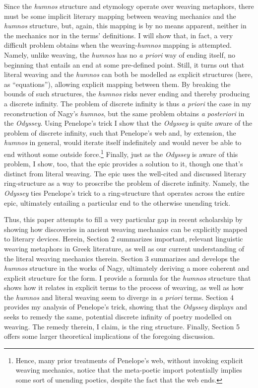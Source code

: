 \documentclass[12pt]{article}
\begin{document}
Since the \textit{humnos} structure and etymology operate over weaving metaphors, there must be some implicit literary mapping between weaving mechanics and the \textit{humnos} structure, but, again, this mapping is by no means apparent, neither in the mechanics nor in the terms' definitions. I will show that, in fact, a very difficult problem obtains when the weaving-\textit{humnos} mapping is attempted. Namely, unlike weaving, the \textit{humnos} has no \textit{a priori} way of ending itself, no beginning that entails an end at some pre-defined point. Still, it turns out that literal weaving and the \textit{humnos} can both be modelled as explicit structures (here, as ``equations''), allowing explicit mapping between them. By breaking the bounds of such structures, the \textit{humnos} risks never ending and thereby producing a discrete infinity. The problem of discrete infinity is thus \textit{a priori} the case in my reconstruction of Nagy's \textit{humnos}, but the same problem obtains \textit{a posteriori} in the \textit{Odyssey}. Using Penelope's trick I show that the \textit{Odyssey} is quite aware of the problem of discrete infinity, such that Penelope's web and, by extension, the \textit{humnos} in general, would iterate itself indefinitely and would never be able to end without some outside force.\footnote{ Hence, many prior treatments of Penelope's web, without invoking explicit weaving mechanics, notice that the meta-poetic import potentially implies some sort of unending poetics, despite the fact that the web ends.} Finally, just as the \textit{Odyssey} is aware of this problem, I show, too, that the epic provides a solution to it, though one that's distinct from literal weaving. The epic uses the well-cited and discussed literary ring-structure as a way to proscribe the problem of discrete infinity. Namely, the \textit{Odyssey} ties Penelope's trick to a ring-structure that operates across the entire epic, ultimately entailing a particular end to the otherwise unending trick.

Thus, this paper attempts to fill a very particular gap in recent scholarship by showing how discoveries in ancient weaving mechanics can be explicitly mapped to literary devices. Herein, Section 2 summarizes important, relevant linguistic weaving metaphors in Greek literature, as well as our current understanding of the literal weaving mechanics therein. Section 3 summarizes and develops the \textit{humnos} structure in the works of Nagy, ultimately deriving a more coherent and explicit structure for the form. I provide a formula for the \textit{humnos} structure that shows how it relates in explicit terms to the process of weaving, as well as how the \textit{humnos} and literal weaving seem to diverge in \textit{a priori} terms. Section 4 provides my analysis of Penelope's trick, showing that the \textit{Odyssey} displays and seeks to remedy the same, potential discrete infinity of poetry modelled on weaving. The remedy therein, I claim, is the ring structure. Finally, Section 5 offers some larger theoretical implications of the foregoing discussion.
\end{document}
